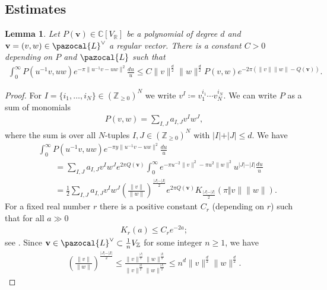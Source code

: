 \documentclass[a4paper,11pt]{amsart} %
\newcommand{\8}{\infty}
\newcommand{\Z}{\mathbb{Z}}
\newcommand{\vbf}{\mathbf{v}}
\newcommand{\R}{\mathbb{R}}
\newcommand{\C}{\mathbb{C}}
\newcommand{\Lcal}{\pazocal{L}}
\theoremstyle{mytheoremstyle}
\newtheorem{lem}[thm]{Lemma}
\theoremstyle{remark}
\numberwithin{equation}{section}
\begin{document}
\subsection{Estimates}



\begin{lem}\label{lemmapolynomial} Let $P(\vbf) \in \C[V_\R]$ be a polynomial of degree $d$ and $\vbf=(v,w) \in \Lcal^\vee$ a regular vector. There is a constant $C>0$ depending on $P$ and $\Lcal$ such that
\begin{align}
\int_0^\8   P(u^{-1}v,uw) e^{-\pi \lVert u^{-1}v-uw \rVert^2} \frac{du}{u} \leq  C \lVert v \rVert^{\frac{d}{2}} \lVert w \rVert^{\frac{d}{2}} P(v,w) e^{-2\pi \left ( \lVert v \rVert \lVert w \rVert-Q(\vbf) \right ) }.
\end{align}
\end{lem}
\begin{proof}
For $I=\{i_1, \dots,i_N\} \in (\Z_{\geq 0})^N$ we write $v^I \coloneqq v_1^{i_1} \cdots v_N^{i_N}$. We can write $P$ as a sum of monomials
\begin{align}
P(v,w)=\sum_{I,J} a_{I,J}v^Iw^J,
\end{align} 
where the sum is over all $N$-tuples $I,J \in (\Z_{\geq 0})^N$ with $\vert I \vert+\vert J \vert \leq d$.
We have
\begin{align}
& \int_0^\8   P(u^{-1}v,uw) e^{-\pi y \lVert u^{-1}v-uw \rVert^2} \frac{du}{u} \\
&\qquad = \sum_{I,J} a_{I,J}v^Iw^J e^{2 \pi Q(\vbf)}\int_0^\8  e^{-\pi u^{-2}\lVert v \rVert^2-\pi u^2 \lVert w \rVert^2} u^{\vert J \vert-\vert I \vert}\frac{du}{u} \\
&\qquad = \frac{1}{2}\sum_{I,J} a_{I,J}v^Iw^J  \left ( \frac{\lVert v \rVert}{\lVert w \rVert} \right )^{\frac{\vert J \vert-\vert I \vert}{2}} e^{2 \pi Q(\vbf)} K_{\frac{\vert J \vert-\vert I \vert}{2}}(\pi \Vert v \rVert \lVert w \rVert).
\end{align}
For a fixed real number  $r$ there is a positive constant $C_r$ (depending on $r$) such that for all $a \gg 0$
\begin{align}
K_{r}(a) \leq C_re^{-2a};
\end{align}
see \cite[K7 p.~271]{langelliptic}. Since $\vbf \in \Lcal^\vee \subset \frac{1}{n}V_\Z$ for some integer $n \geq 1$, we have
\begin{align}
\left ( \frac{\lVert v \rVert}{\lVert w \rVert} \right )^{\frac{\vert J \vert-\vert I \vert}{2}} \leq \frac{\lVert v \rVert^\frac{\vert J \vert}{2} \lVert w \rVert^\frac{\vert I \vert}{2}}{\lVert v \rVert^\frac{\vert I \vert}{2} \lVert w \rVert^\frac{\vert J \vert}{2}}\leq n^d \lVert v \rVert^{\frac{d}{2}} \lVert w \rVert^{\frac{d}{2}}.
\end{align}  
\end{proof}
\end{document}
